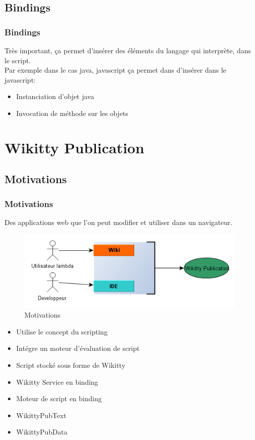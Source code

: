 \documentclass[12pt,a4paper,utf8x]{beamer}
\begin{document}
\subsection*{Bindings}
\begin{frame}\frametitle{Bindings}
Très important, ça permet d'insérer des éléments du langage qui interprète, dans le script.\\
\vspace{5mm}
Par exemple dans le cas java, javascript ça permet dans d'insérer dans le javascript:
\begin{itemize}
\item Instanciation d'objet java
\item Invocation de méthode sur les objets
\end{itemize}
\end{frame}


\section{Wikitty Publication} 
\subsection*{Motivations}
\begin{frame}\frametitle{Motivations}

Des applications web que l'on peut modifier et utiliser dans un navigateur.\pause


\begin{figure}\pause
\includegraphics[scale=0.5]{../image/wpwhy.png} 
\caption{Motivations}
\end{figure}

\end{frame}

\begin{frame}
\begin{itemize}
\item Utilise le concept du scripting
\item Intégre un moteur d'évaluation de script
\item Script stocké sous forme de Wikitty
\item Wikitty Service en binding
\item Moteur de script en binding
\item WikittyPubText
\item WikittyPubData





\end{itemize}

\end{frame}
\end{document}
